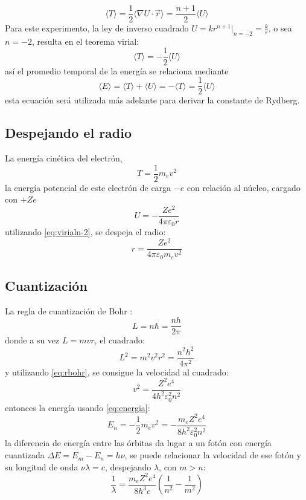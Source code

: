 \documentclass[a4paper,twocolumn,10pt]{article}
\newcommand{\braket}[1]{ \langle #1 \rangle }
\begin{document}
\begin{equation}\label{eq:virialGenteorem}
    \braket{T} = \frac{1}{2} \braket{\nabla U \cdot \vec r} = \frac{n+1}{2} \braket{U}
\end{equation}
Para este experimento, la ley de inverso cuadrado $U = k r^{n+1}|_{n=-2} = \frac{k}{r}$, o sea $n=-2$, resulta en el teorema virial:
\begin{equation}\label{eq:virialn-2}
    \braket{T} = -\frac{1}{2} \braket{U}
\end{equation}
así el promedio temporal de la energía se relaciona mediante
\begin{equation}\label{eq:energia}
    \braket{E} = \braket{T} + \braket{U} = -\braket{T} = \frac{1}{2}\braket{U}
\end{equation}
esta ecuación será utilizada más adelante para derivar la constante de Rydberg.

\subsection{Despejando el radio}
La energía cinética del electrón,
\begin{equation}\label{eq:electronT}
    T = \frac{1}{2}m_e v^2
\end{equation}
la energía potencial de este electrón de carga $-e$ con relación al núcleo, cargado con $+Ze$
\begin{equation}\label{eq:electronU}
    U = - \frac{Z e^2}{4 \pi \varepsilon_0 r}
\end{equation}
utilizando \ref{eq:virialn-2}, se despeja el radio:
\begin{equation}\label{eq:rbohr}
    r = \frac{Z e^2}{4 \pi \varepsilon_0 m_e v^2}
\end{equation}

\subsection{Cuantización}
La regla de cuantización de Bohr \cite{bohr}:
$$
L = n \hbar = \frac{nh}{2\pi}
$$
donde a su vez $L = mvr$, el cuadrado:
$$
L^2 = m^2 v^2 r^2 =  \frac{n^2 h^2}{4\pi^2}
$$
y utilizando \ref{eq:rbohr}, se consigue la velocidad al cuadrado:
$$
v^2 = \frac{Z^2 e^4}{4 h^2 \varepsilon_0^2 n^2}
$$
entonces la energía usando \ref{eq:energia}:
\begin{equation}\label{eq:E}
    E_n = - \frac{1}{2} m_e v^2 = - \frac{m_e Z^2 e^4}{8 h^2 \varepsilon_0^2 n^2}
\end{equation}
la diferencia de energía entre las órbitas da lugar a un fotón con energía cuantizada $\Delta E = E_m - E_n = h \nu$, se puede relacionar la velocidad de ese fotón y su longitud de onda $\nu \lambda = c$, despejando $\lambda$, con $m>n$:
\begin{equation}\label{eq:rydberg}
    \frac{1}{\lambda} = \frac{m_e Z^2 e^4}{8 h^3 c} (
    \frac{1}{n^2} - \frac{1}{m^2}    
    )
\end{equation}
\end{document}
